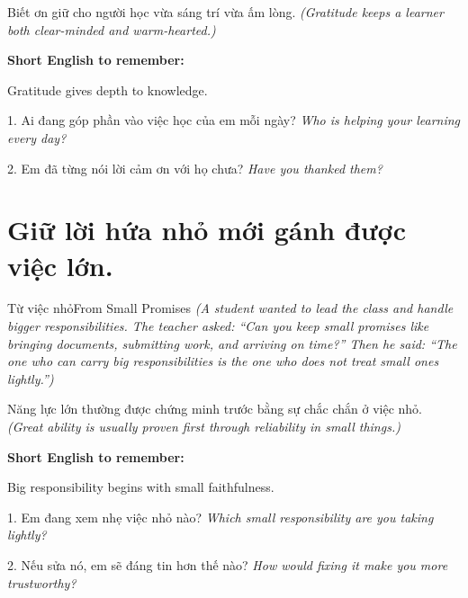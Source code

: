 \begin{baihoc}
Biết ơn giữ cho người học vừa sáng trí vừa ấm lòng.
\textit{(Gratitude keeps a learner both clear-minded and warm-hearted.)}
\end{baihoc}

\begin{ghinhoanh}
\textbf{Short English to remember:}

Gratitude gives depth to knowledge.

\end{ghinhoanh}

\begin{tuhocnhanh}
1. Ai đang góp phần vào việc học của em mỗi ngày? \textit{Who is helping your learning every day?}

2. Em đã từng nói lời cảm ơn với họ chưa? \textit{Have you thanked them?}
\end{tuhocnhanh}
\ngancach

\section{Giữ lời hứa nhỏ mới gánh được việc lớn.}
\begin{truyen}{Từ việc nhỏ}{From Small Promises}
\textit{(A student wanted to lead the class and handle bigger responsibilities. The teacher asked: ``Can you keep small promises like bringing documents, submitting work, and arriving on time?'' Then he said: ``The one who can carry big responsibilities is the one who does not treat small ones lightly.'')}
\end{truyen}

\begin{baihoc}
Năng lực lớn thường được chứng minh trước bằng sự chắc chắn ở việc nhỏ.
\textit{(Great ability is usually proven first through reliability in small things.)}
\end{baihoc}

\begin{ghinhoanh}
\textbf{Short English to remember:}

Big responsibility begins with small faithfulness.

\end{ghinhoanh}

\begin{tuhocnhanh}
1. Em đang xem nhẹ việc nhỏ nào? \textit{Which small responsibility are you taking lightly?}

2. Nếu sửa nó, em sẽ đáng tin hơn thế nào? \textit{How would fixing it make you more trustworthy?}
\end{tuhocnhanh}
\ngancach

